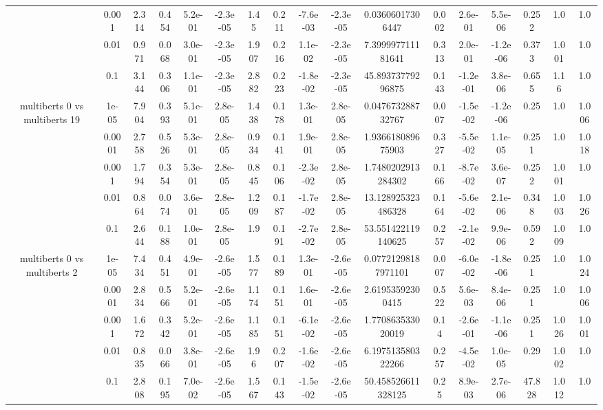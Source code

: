 \begin{tabular}{|c|c|c|c|c|c|c|c|c|c|c|c|c|c|c|c|c|}
 & 0.001 & 2.314 & 0.454 & 5.2e-01 & -2.3e-05 & 1.45 & 0.211 & -7.6e-03 & -2.3e-05 & 0.03606017306447 & 0.002 & 2.6e-01 & 5.5e-06 & 0.252 & 1.0 & 1.0 \\
 & 0.01 & 0.971 & 0.068 & 3.0e-01 & -2.3e-05 & 1.907 & 0.216 & 1.1e-02 & -2.3e-05 & 7.399997711181641 & 0.313 & 2.0e-01 & -1.2e-06 & 0.373 & 1.001 & 1.0 \\
 & 0.1 & 3.144 & 0.306 & 1.1e-01 & -2.3e-05 & 2.882 & 0.223 & -1.8e-02 & -2.3e-05 & 45.89373779296875 & 0.143 & -1.2e-01 & 3.8e-06 & 0.655 & 1.16 & 1.0 \\
\hline
\multirow{5}{*}{multiberts 0 vs multiberts 19} & 1e-05 & 7.904 & 0.393 & 5.1e-01 & 2.8e-05 & 1.438 & 0.178 & 1.3e-01 & 2.8e-05 & 0.047673288732767 & 0.007 & -1.5e-02 & -1.2e-06 & 0.25 & 1.0 & 1.006 \\
 & 0.0001 & 2.758 & 0.526 & 5.3e-01 & 2.8e-05 & 0.934 & 0.141 & 1.9e-01 & 2.8e-05 & 1.936618089675903 & 0.327 & -5.5e-02 & 1.1e-05 & 0.251 & 1.0 & 1.018 \\
 & 0.001 & 1.794 & 0.354 & 5.3e-01 & 2.8e-05 & 0.845 & 0.106 & -2.3e-02 & 2.8e-05 & 1.7480202913284302 & 0.166 & -8.7e-02 & 3.6e-07 & 0.252 & 1.001 & 1.0 \\
 & 0.01 & 0.864 & 0.074 & 3.6e-01 & 2.8e-05 & 1.209 & 0.187 & -1.7e-02 & 2.8e-05 & 13.128925323486328 & 0.164 & -5.6e-02 & 2.1e-06 & 0.348 & 1.003 & 1.026 \\
 & 0.1 & 2.644 & 0.188 & 1.0e-01 & 2.8e-05 & 1.9 & 0.191 & -2.7e-02 & 2.8e-05 & 53.551422119140625 & 0.257 & -2.1e-02 & 9.9e-06 & 0.592 & 1.009 & 1.0 \\
\hline
\multirow{5}{*}{multiberts 0 vs multiberts 2} & 1e-05 & 7.434 & 0.451 & 4.9e-01 & -2.6e-05 & 1.577 & 0.189 & 1.3e-01 & -2.6e-05 & 0.07721298187971101 & 0.007 & -6.0e-02 & -1.8e-06 & 0.251 & 1.0 & 1.024 \\
 & 0.0001 & 2.834 & 0.566 & 5.2e-01 & -2.6e-05 & 1.174 & 0.151 & 1.6e-01 & -2.6e-05 & 2.61953592300415 & 0.522 & 5.6e-03 & 8.4e-06 & 0.251 & 1.0 & 1.006 \\
 & 0.001 & 1.672 & 0.342 & 5.2e-01 & -2.6e-05 & 1.185 & 0.151 & -6.1e-02 & -2.6e-05 & 1.770863533020019 & 0.14 & -2.6e-01 & -1.1e-06 & 0.251 & 1.026 & 1.001 \\
 & 0.01 & 0.835 & 0.066 & 3.8e-01 & -2.6e-05 & 1.96 & 0.207 & -1.6e-02 & -2.6e-05 & 6.197513580322266 & 0.257 & -4.5e-02 & 1.0e-05 & 0.29 & 1.002 & 1.0 \\
 & 0.1 & 2.808 & 0.195 & 7.0e-02 & -2.6e-05 & 1.567 & 0.143 & -1.5e-02 & -2.6e-05 & 50.458526611328125 & 0.25 & 8.9e-03 & 2.7e-06 & 47.828 & 1.012 & 1.0 \\

\end{tabular}
